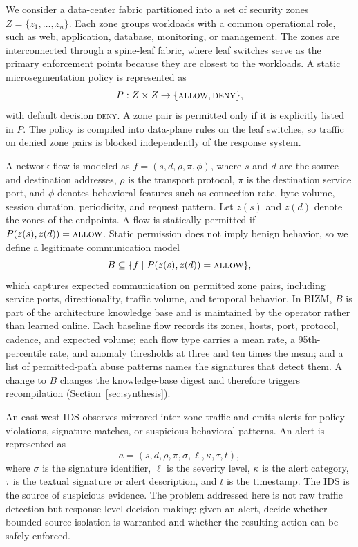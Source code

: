 \documentclass[final,5p]{elsarticle}
\begin{document}
We consider a data-center fabric partitioned into a set of security zones $Z=\{z_1,\ldots,z_n\}$. Each zone groups workloads with a common operational role, such as web, application, database, monitoring, or management. The zones are interconnected through a spine-leaf fabric, where leaf switches serve as the primary enforcement points because they are closest to the workloads. A static microsegmentation policy is represented as
\[
P: Z \times Z \rightarrow \{\textsc{allow},\textsc{deny}\},
\]
with default decision \textsc{deny}. A zone pair is permitted only if it is explicitly listed in $P$. The policy is compiled into data-plane rules on the leaf switches, so traffic on denied zone pairs is blocked independently of the response system.

A network flow is modeled as $f=(s,d,\rho,\pi,\phi)$, where $s$ and $d$ are the source and destination addresses, $\rho$ is the transport protocol, $\pi$ is the destination service port, and $\phi$ denotes behavioral features such as connection rate, byte volume, session duration, periodicity, and request pattern. Let $z(s)$ and $z(d)$ denote the zones of the endpoints. A flow is statically permitted if $P(z(s),z(d))=\textsc{allow}$. Static permission does not imply benign behavior, so we define a legitimate communication model
\[
B \subseteq \{ f \mid P(z(s),z(d))=\textsc{allow}\},
\]
which captures expected communication on permitted zone pairs, including service ports, directionality, traffic volume, and temporal behavior. In BIZM, $B$ is part of the architecture knowledge base and is maintained by the operator rather than learned online. Each baseline flow records its zones, hosts, port, protocol, cadence, and expected volume; each flow type carries a mean rate, a 95th-percentile rate, and anomaly thresholds at three and ten times the mean; and a list of permitted-path abuse patterns names the signatures that detect them. A change to $B$ changes the knowledge-base digest and therefore triggers recompilation (Section~\ref{sec:synthesis}).

An east-west IDS observes mirrored inter-zone traffic and emits alerts for policy violations, signature matches, or suspicious behavioral patterns. An alert is represented as
\[
a=(s,d,\rho,\pi,\sigma,\ell,\kappa,\tau,t),
\]
where $\sigma$ is the signature identifier, $\ell$ is the severity level, $\kappa$ is the alert category, $\tau$ is the textual signature or alert description, and $t$ is the timestamp. The IDS is the source of suspicious evidence. The problem addressed here is not raw traffic detection but response-level decision making: given an alert, decide whether bounded source isolation is warranted and whether the resulting action can be safely enforced.
\end{document}

